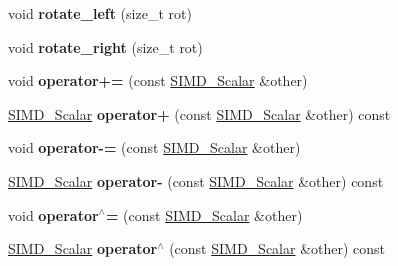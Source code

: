 \begin{DoxyCompactItemize}
\item 
\hypertarget{classBotan_1_1SIMD__Scalar_a5c63bd8c0d74746272dbf9d469e7d00a}{void {\bfseries rotate\-\_\-left} (size\-\_\-t rot)}\label{classBotan_1_1SIMD__Scalar_a5c63bd8c0d74746272dbf9d469e7d00a}

\item 
\hypertarget{classBotan_1_1SIMD__Scalar_ab1dcfbc8241a876e107f7ecdf672589e}{void {\bfseries rotate\-\_\-right} (size\-\_\-t rot)}\label{classBotan_1_1SIMD__Scalar_ab1dcfbc8241a876e107f7ecdf672589e}

\item 
\hypertarget{classBotan_1_1SIMD__Scalar_a50c928ce9444a5205796c68603038447}{void {\bfseries operator+=} (const \hyperlink{classBotan_1_1SIMD__Scalar}{S\-I\-M\-D\-\_\-\-Scalar} \&other)}\label{classBotan_1_1SIMD__Scalar_a50c928ce9444a5205796c68603038447}

\item 
\hypertarget{classBotan_1_1SIMD__Scalar_a84db20df0fc88d10900195daf780f4df}{\hyperlink{classBotan_1_1SIMD__Scalar}{S\-I\-M\-D\-\_\-\-Scalar} {\bfseries operator+} (const \hyperlink{classBotan_1_1SIMD__Scalar}{S\-I\-M\-D\-\_\-\-Scalar} \&other) const }\label{classBotan_1_1SIMD__Scalar_a84db20df0fc88d10900195daf780f4df}

\item 
\hypertarget{classBotan_1_1SIMD__Scalar_aeccc82c736a842974595e6084a3fbbd9}{void {\bfseries operator-\/=} (const \hyperlink{classBotan_1_1SIMD__Scalar}{S\-I\-M\-D\-\_\-\-Scalar} \&other)}\label{classBotan_1_1SIMD__Scalar_aeccc82c736a842974595e6084a3fbbd9}

\item 
\hypertarget{classBotan_1_1SIMD__Scalar_a6c1fc79bf6ef600bcb26d2964ea908b1}{\hyperlink{classBotan_1_1SIMD__Scalar}{S\-I\-M\-D\-\_\-\-Scalar} {\bfseries operator-\/} (const \hyperlink{classBotan_1_1SIMD__Scalar}{S\-I\-M\-D\-\_\-\-Scalar} \&other) const }\label{classBotan_1_1SIMD__Scalar_a6c1fc79bf6ef600bcb26d2964ea908b1}

\item 
\hypertarget{classBotan_1_1SIMD__Scalar_a643fd10de10eeb27e21908526db8e5f7}{void {\bfseries operator$^\wedge$=} (const \hyperlink{classBotan_1_1SIMD__Scalar}{S\-I\-M\-D\-\_\-\-Scalar} \&other)}\label{classBotan_1_1SIMD__Scalar_a643fd10de10eeb27e21908526db8e5f7}

\item 
\hypertarget{classBotan_1_1SIMD__Scalar_aac4a4e988b82484c150dbed190d7e01d}{\hyperlink{classBotan_1_1SIMD__Scalar}{S\-I\-M\-D\-\_\-\-Scalar} {\bfseries operator$^\wedge$} (const \hyperlink{classBotan_1_1SIMD__Scalar}{S\-I\-M\-D\-\_\-\-Scalar} \&other) const }\label{classBotan_1_1SIMD__Scalar_aac4a4e988b82484c150dbed190d7e01d}


\end{DoxyCompactItemize}
